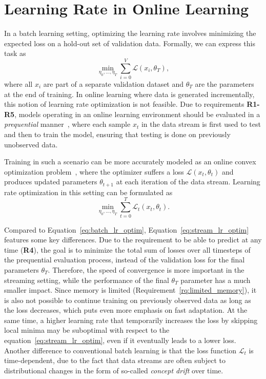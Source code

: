 \documentclass[runningheads]{llncs}
\begin{document}
\section{Learning Rate in Online Learning}

In a batch learning setting, optimizing the learning rate involves minimizing the expected loss on a hold-out set of validation data.
Formally, we can express this task as
\begin{equation}
	\label{eq:batch_lr_optim}
	\min_{\eta_0, \ldots, \eta_T} \sum_{i=0}^V \mathcal{L}(x_i, \theta_T),
\end{equation}
where all $x_i$ are part of a separate validation dataset and $\theta_T$ are the parameters at the end of training.
In online learning where data is generated incrementally, this notion of learning rate optimization is not feasible.
Due to requirements \textbf{R1-R5}, models operating in an online learning environment should be evaluated in a \textit{prequential} manner~\cite{bifetMOAMassiveOnline2010}, where each sample $x_t$ in the data stream is first used to test and then to train the model, ensuring that testing is done on previously unobserved data.

Training in such a scenario can be more accurately modeled as an online convex optimization problem~\cite{shalev-shwartzOnlineLearningOnline2011,hazanIntroductionOnlineConvex2016}, where the optimizer suffers a loss $\mathcal{L}(x_t, \theta_{t})$ and produces updated parameters $\theta_{t+1}$ at each iteration of the data stream.
Learning rate optimization in this setting can be formulated as
\begin{equation}
	\label{eq:stream_lr_optim}
	\min_{\eta_0, \ldots, \eta_T} \sum_{t=0}^{T} \mathcal{L}_t(x_t,\theta_t).
\end{equation}

Compared to Equation~\eqref{eq:batch_lr_optim}, Equation~\eqref{eq:stream_lr_optim} features some key differences.
Due to the requirement to be able to predict at any time (\textbf{R4}), the goal is to minimize the total sum of losses over all timesteps of the prequential evaluation process, instead of the validation loss for the final parameters $\theta_T$.
Therefore, the speed of convergence is more important in the streaming setting, while the performance of the final $\theta_T$ parameter has a much smaller impact.
Since memory is limited (Requirement~\ref{rq:limited_memory}), it is also not possible to continue training on previously observed data as long as the loss decreases, which puts even more emphasis on fast adaptation.
At the same time, a higher learning rate that temporarily increases the loss by skipping local minima may be suboptimal with respect to the equation~\eqref{eq:stream_lr_optim}, even if it eventually leads to a lower loss.
Another difference to conventional batch learning is that the loss function $\mathcal{L}_t$ is time-dependent, due to the fact that data streams are often subject to distributional changes in the form of so-called \textit{concept drift} over time.
\end{document}

